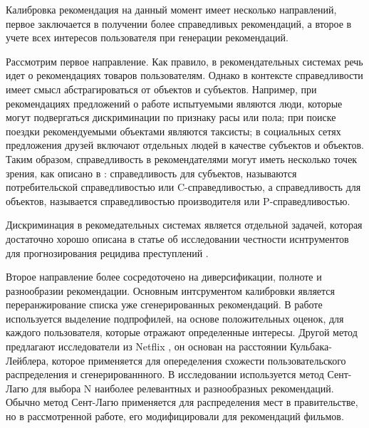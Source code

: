 Калибровка рекомендация на данный момент имеет несколько направлений,
 первое заключается в получении более справедливых рекомендаций, а второе 
 в учете всех интересов пользователя при генерации рекомендаций. 
 
 Рассмотрим первое направление. Как правило, в рекомендательных 
 системах речь идет о рекомендациях товаров пользователям. 
 Однако в контексте справедливости имеет смысл абстрагироваться
  от объектов и субъектов. Например, при рекомендациях предложений о 
  работе испытуемыми являются люди, которые могут подвергаться 
  дискриминации по признаку расы или пола; при поиске поездки 
  рекомендуемыми объектами являются таксисты; в социальных сетях 
  предложения друзей включают отдельных людей в качестве субъектов 
  и объектов. Таким образом, справедливость в рекомендателями 
  могут иметь несколько точек зрения, как описано в \cite{bib1}: 
  справедливость для субъектов, называются потребительской справедливостью или 
  C-справедливостью, а справедливость для объектов, называется 
  справедливостью производителя или P-справедливостью. 

  Дискриминация в рекомедательных системах является отдельной задачей,
  которая достаточно хорошо описана в статье об исследовании честности
  иснтрументов для прогнозирования рецидива преступлений \cite{bib2}. 

  Второе направление более сосредоточено на диверсификации, 
  полноте и разнообразии рекомендации. Основным интсрументом 
  калибровки является переранжирование списка уже сгенерированных
   рекомендаций. В работе \cite{bib3} используется выделение подпрофилей, 
   на основе положительных оценок, 
   для каждого пользователя, которые отражают 
   определенные интересы. Другой метод предлагают исследователи из 
   Netflix \cite{bib4}, он основан на расстоянии Кульбака-Лейблера, 
   которое применяется для опеределения схожести пользовательского 
   распределения и сгенерированнного. В исследовании \cite{bib5} 
   используется метод Сент-Лагю для выбора N наиболее релевантных и 
   разнообразных рекомендаций. Обычно метод Сент-Лагю применяется для 
   распределения мест в правительстве, но в рассмотренной работе, его 
   модифицировали для рекомендаций фильмов.